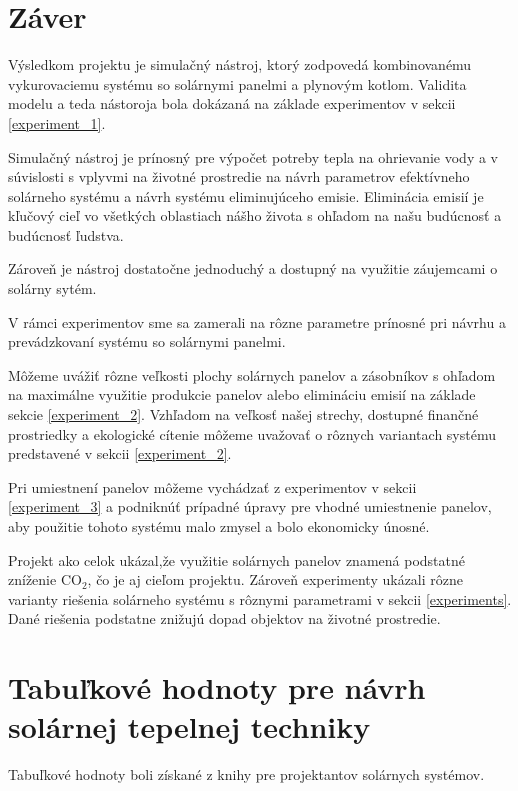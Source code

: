 \documentclass[a4paper, 11pt]{article}
\begin{document}
\section{Záver}
Výsledkom projektu je simulačný nástroj, ktorý zodpovedá kombinovanému vykurovaciemu systému so solárnymi panelmi a plynovým kotlom. Validita modelu a teda nástoroja bola dokázaná na základe experimentov v sekcii \ref{experiment_1}.


Simulačný nástroj je prínosný pre výpočet potreby tepla na ohrievanie vody a v súvislosti s vplyvmi na životné prostredie na návrh parametrov efektívneho solárneho systému a návrh systému eliminujúceho emisie. Eliminácia emisií je kľučový cieľ vo všetkých oblastiach nášho života s ohľadom na našu budúcnosť a budúcnosť ľudstva. 

Zároveň je nástroj dostatočne jednoduchý a dostupný na využitie záujemcami o solárny sytém.

V rámci experimentov sme sa zamerali na rôzne parametre prínosné pri návrhu a prevádzkovaní systému so solárnymi panelmi. 

Môžeme uvážiť rôzne veľkosti plochy solárnych panelov a zásobníkov s ohľadom na maximálne využitie produkcie panelov alebo elimináciu emisií na základe sekcie \ref{experiment_2}. Vzhľadom na veľkosť našej strechy, dostupné finančné prostriedky a ekologické cítenie môžeme uvažovať o rôznych variantach systému predstavené v sekcii \ref{experiment_2}.

Pri umiestnení panelov môžeme vychádzať z experimentov v sekcii \ref{experiment_3} a podniknúť prípadné úpravy pre vhodné umiestnenie panelov, aby použitie tohoto systému malo zmysel a bolo ekonomicky únosné.

Projekt ako celok ukázal,že využitie solárnych panelov znamená podstatné zníženie CO$_2$, čo je aj cieľom projektu. Zároveň experimenty ukázali rôzne varianty riešenia solárneho systému s rôznymi parametrami v sekcii \ref{experiments}. Dané riešenia podstatne znižujú dopad objektov na životné prostredie.


\newpage



\newpage
\appendix

\section{Tabuľkové hodnoty pre návrh solárnej tepelnej techniky}\label{tabulky}

Tabuľkové hodnoty boli získané z knihy pre projektantov solárnych systémov\cite{Cihelka}.
\end{document}
